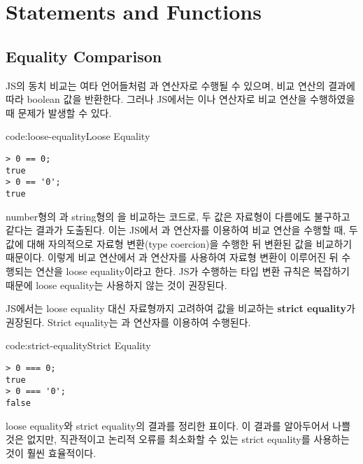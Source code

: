 \section{Statements and Functions}\label{sect:statements-and-functions}

\subsection*{Equality Comparison}

JS의 동치 비교는 여타 언어들처럼 \cd{==}과 \cd{!=} 연산자로 수행될 수 있으며, 비교 연산의 결과에 따라 boolean 값을 반환한다. 그러나 JS에서는 \cd{==}이나 \cd{!=} 연산자로 비교 연산을 수행하였을 때 문제가 발생할 수 있다.

\begin{codeenv}{code:loose-equality}{Loose Equality}\begin{verbatim}
> 0 == 0;
true
> 0 == '0';
true
\end{verbatim}
\end{codeenv}

\는 number형의 과 string형의 을 비교하는 코드로, 두 값은 자료형이 다름에도 불구하고 같다는 결과가 도출된다. 이는 JS에서 \cd{==}과 \cd{!=} 연산자를 이용하여 비교 연산을 수행할 때, 두 값에 대해 자의적으로 자료형 변환(type coercion)을 수행한 뒤 변환된 값을 비교하기 때문이다. 이렇게 비교 연산에서 \cd{==}과 \cd{!=} 연산자를 사용하여 자료형 변환이 이루어진 뒤 수행되는 연산을 loose equality이라고 한다. JS가 수행하는 타입 변환 규칙은 복잡하기 때문에 loose equality는 사용하지 않는 것이 권장된다.


JS에서는 loose equality 대신 자료형까지 고려하여 값을 비교하는 \textbf{strict equality}가 권장된다. Strict equality는 \cd{===}과 \cd{!==} 연산자를 이용하여 수행된다.

\begin{codeenv}{code:strict-equality}{Strict Equality}\begin{verbatim}
> 0 === 0;
true
> 0 === '0';
false
\end{verbatim}
\end{codeenv}

\은 loose equality와 strict equality의 결과를 정리한 표이다. 이 결과를 알아두어서 나쁠 것은 없지만, 직관적이고 논리적 오류를 최소화할 수 있는 strict equality를 사용하는 것이 훨씬 효율적이다.

